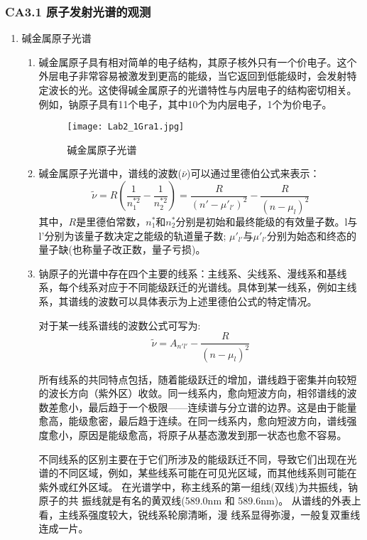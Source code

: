 \documentclass[dvipsnames, svgnames,a4paper,11pt]{article}
\begin{document}
	\subsubsection{CA3.1 原子发射光谱的观测}
	\begin{enumerate}
		\item 碱金属原子光谱
		\begin{enumerate}
			\item 碱金属原子具有相对简单的电子结构，其原子核外只有一个价电子。这个外层电子非常容易被激发到更高的能级，当它返回到低能级时，会发射特定波长的光。这使得碱金属原子的光谱特性与内层电子的结构密切相关。例如，钠原子具有11个电子，其中10个为内层电子，1个为价电子。
			
			\begin{figure}[htbp]
				\centering
				\texttt{[image: Lab2\_1Gra1.jpg]}
				\caption{碱金属原子光谱}
				\label{fig:fig1}
			\end{figure}
			
			\item 碱金属原子光谱中，谱线的波数($\bar{\nu}$)可以通过里德伯公式来表示：
			\[
			\tilde{\nu} = R \left( \frac{1}{n_1^{*2}} - \frac{1}{n_2^{*2}} \right)=\dfrac{R}{(n'-\mu'_{l'})^2}-\dfrac{R}{(n-\mu_{l})^2}
			\]
			其中，$R$是里德伯常数，$n_1^*$和$n_2^*$分别是初始和最终能级的有效量子数。l与l'分别为该量子数决定之能级的轨道量子数;
			$\mu'_{l'}$与$\mu'_{l'}$分别为始态和终态的量子缺(也称量子改正数，量子亏损)。
			\item 钠原子的光谱中存在四个主要的线系：主线系、尖线系、漫线系和基线系，每个线系对应于不同能级跃迁的光谱线。具体到某一线系，例如主线系，其谱线的波数可以具体表示为上述里德伯公式的特定情况。
			
			对于某一线系谱线的波数公式可写为:
			\[\tilde{\nu} = A_{n'l'}-\dfrac{R}{(n-\mu_{l})^2}\]
			
			所有线系的共同特点包括，随着能级跃迁的增加，谱线趋于密集并向较短的波长方向（紫外区）收敛。同一线系内，愈向短波方向，相邻谱线的波数差愈小，最后趋于一个极限——连续谱与分立谱的边界。这是由于能量愈高，能级愈密，最后趋于连续。在同一线系内，愈向短波方向，谱线强度愈小，原因是能级愈高，将原子从基态激发到那一状态也愈不容易。
			
			不同线系的区别主要在于它们所涉及的能级跃迁不同，导致它们出现在光谱的不同区域，例如，某些线系可能在可见光区域，而其他线系则可能在紫外或红外区域。
			在光谱学中，称主线系的第一组线(双线)为共振线，钠原子的共 振线就是有名的黄双线(589.0nm 和 589.6nm)。
			从谱线的外表上看，主线系强度较大，锐线系轮廓清晰，漫 线系显得弥漫，一般复双重线连成一片。
		\end{enumerate}
		

\end{enumerate}
\end{document}
